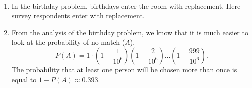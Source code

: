 
\setcounter{theorem}{25}
\begin{exercise}[BH.1.26]
\begin{solution}~
	\begin{enumerate}
		\item In the birthday problem, birthdays enter the room with replacement. Here survey respondents enter with replacement.
		\item From the analysis of the birthday problem, we know that it is much easier to look at the probability of no match ($A$).
		$$P(A) = 1\cdot \left(1-\frac{1}{10^6}\right)\left(1-\frac{2}{10^6}\right)\ldots \left(1-\frac{999}{10^6}\right).$$
		The probability that at least one person will be chosen more than once is equal to $1-P(A) \approx 0.393$.
	\end{enumerate}
\end{solution}
\end{exercise}


